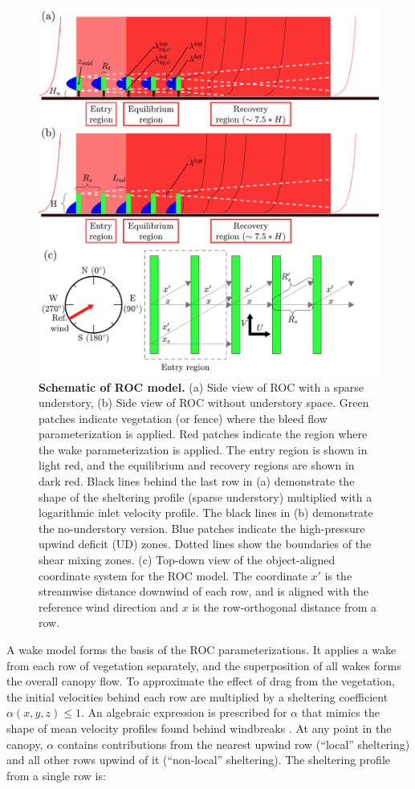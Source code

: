 \begin{figure}[H]\label{fig:ROCmodel}
\includegraphics[width=17cm]{Images/ROC_model_schematic.png}
\caption{\textbf{Schematic of ROC model.} (a) Side view of ROC with a sparse understory, (b) Side view of ROC without understory space. Green patches indicate vegetation (or fence) where the bleed flow parameterization is applied. Red patches indicate the region where the wake parameterization is applied. The entry region is shown in light red, and the equilibrium and recovery regions are shown in dark red.  Black lines behind the last row in (a) demonstrate the shape of the sheltering profile (sparse understory) multiplied with a logarithmic inlet velocity profile. The black lines in (b) demonstrate the no-understory version. Blue patches indicate the high-pressure upwind deficit (UD) zones. Dotted lines show the boundaries of the shear mixing zones. 
    (c) Top-down view of the object-aligned coordinate system for the ROC model. The coordinate $x'$ is the streamwise distance downwind of each row, and is aligned with the reference wind direction and $x$ is the row-orthogonal distance from a row.}
\end{figure}


A wake model forms the basis of the ROC parameterizations. It applies a wake from each row of vegetation separately, and the superposition of all wakes forms the overall canopy flow.
To approximate the effect of drag from the vegetation, the initial velocities behind each row are multiplied by a sheltering coefficient $\alpha(x,y,z) \leq 1$.
An algebraic expression is prescribed for $\alpha$ that mimics the shape of mean velocity profiles found behind windbreaks \cite{speckart2014method}. At any point in the canopy, $\alpha$ contains contributions from the nearest upwind row (``local'' sheltering) and all other rows upwind of it (``non-local'' sheltering).
The sheltering profile from a single row is:


